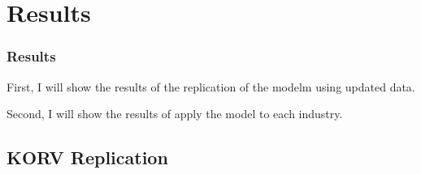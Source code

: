\documentclass[notes,11pt, aspectratio=169]{beamer}
\newenvironment{wideitemize}{\itemize\addtolength{\itemsep}{10pt}}{\enditemize}
\begin{document}
\section{Results}
\begin{frame}
  \frametitle{Results}
  \begin{wideitemize}
    \item First, I will show the results of the replication of the modelm using updated data.
    \item Second, I will show the results of apply the model to each industry.
  \end{wideitemize}
\end{frame}

\subsection{KORV Replication}
\end{document}
